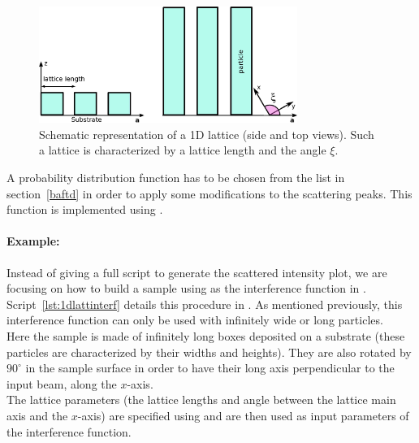 \begin{figure}[ht]
\begin{center}
\includegraphics[width=0.75\textwidth]{Figures/1DGrating}
\end{center}
\caption{Schematic representation of a 1D lattice (side and top views). Such a lattice is characterized by a lattice length and the angle $\xi$.}
\label{fig:1dgrating}
\end{figure}


\vspace{12pt}
A probability distribution function  has to be chosen from the list in section~\ref{baftd} in order to apply some  modifications to the scattering peaks. This function is implemented using . 

\paragraph{Example:} Instead of giving a full script to generate the scattered intensity plot, we are focusing on how to build a sample using  as the interference function in \BornAgain .\\ Script~\ref{lst:1dlattinterf} details this procedure in . As mentioned previously, this interference function can only be used with infinitely wide or long particles.\\ Here the sample is made of infinitely long boxes deposited on a substrate (these particles are characterized by their widths and heights). They are also rotated by $90^{\circ}$  in the sample surface in order to have their long axis perpendicular to the input beam, along the $x$-axis.\\
 The lattice parameters (the lattice lengths and angle between the lattice main axis and the $x$-axis) are specified using  and are then used as input parameters of the interference function.

